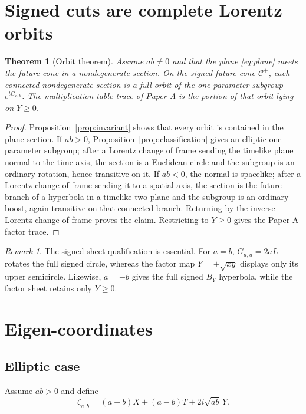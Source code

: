 \documentclass[11pt]{amsart}
\newtheorem{theorem}{Theorem}[section]
\theoremstyle{remark}
\newtheorem*{remark}{Remark}
\begin{document}
\section{Signed cuts are complete Lorentz orbits}

\begin{theorem}[Orbit theorem]\label{thm:orbit}
Assume $ab\ne0$ and that the plane \eqref{eq:plane} meets the future cone in a nondegenerate section.  On the signed future cone $\mathcal C^+$, each connected nondegenerate section is a full orbit of the one-parameter subgroup $e^{tG_{a,b}}$.  The multiplication-table trace of Paper A is the portion of that orbit lying on $Y\ge0$.
\end{theorem}

\begin{proof}
Proposition~\ref{prop:invariant} shows that every orbit is contained in the plane section.  If $ab>0$, Proposition~\ref{prop:classification} gives an elliptic one-parameter subgroup; after a Lorentz change of frame sending the timelike plane normal to the time axis, the section is a Euclidean circle and the subgroup is an ordinary rotation, hence transitive on it.  If $ab<0$, the normal is spacelike; after a Lorentz change of frame sending it to a spatial axis, the section is the future branch of a hyperbola in a timelike two-plane and the subgroup is an ordinary boost, again transitive on that connected branch.  Returning by the inverse Lorentz change of frame proves the claim.  Restricting to $Y\ge0$ gives the Paper-A factor trace.
\end{proof}

\begin{remark}
The signed-sheet qualification is essential.  For $a=b$, $G_{a,a}=2aL$ rotates the full signed circle, whereas the factor map $Y=+\sqrt{xy}$ displays only its upper semicircle.  Likewise, $a=-b$ gives the full signed $B_Y$ hyperbola, while the factor sheet retains only $Y\ge0$.
\end{remark}

\section{Eigen-coordinates}

\subsection{Elliptic case}
Assume $ab>0$ and define
\begin{equation}\label{eq:zeta}
\zeta_{a,b}
=(a+b)X+(a-b)T+2i\sqrt{ab}\,Y.
\end{equation}
\end{document}
